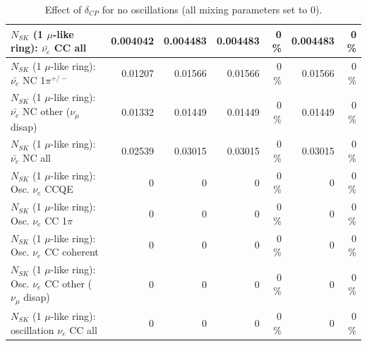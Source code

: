 \begin{table}
\begin{tabular}{| l | r | r | r  r | r  r |}
                            $N_{SK}$ (1 $\mu$-like ring): $\bar{\nu_{e}}$ CC all &        0.004042 &        0.004483 &        0.004483 &        0 \%  &        0.004483 &        0 \%  \\ 
\hline
                     $N_{SK}$ (1 $\mu$-like ring): $\bar{\nu_e}$ NC 1$\pi^{+/-}$ &         0.01207 &         0.01566 &         0.01566 &        0 \%  &         0.01566 &        0 \%  \\ 
          $N_{SK}$ (1 $\mu$-like ring): $\bar{\nu_e}$ NC other ($\nu_\mu$ disap) &         0.01332 &         0.01449 &         0.01449 &        0 \%  &         0.01449 &        0 \%  \\ 
                            $N_{SK}$ (1 $\mu$-like ring): $\bar{\nu_{e}}$ NC all &         0.02539 &         0.03015 &         0.03015 &        0 \%  &         0.03015 &        0 \%  \\ 
\hline
\hline
\hline
                                 $N_{SK}$ (1 $\mu$-like ring): Osc. $\nu_e$ CCQE &               0 &               0 &               0 &        0 \%  &               0 &        0 \%  \\ 
                            $N_{SK}$ (1 $\mu$-like ring): Osc. $\nu_e$ CC 1$\pi$ &               0 &               0 &               0 &        0 \%  &               0 &        0 \%  \\ 
                          $N_{SK}$ (1 $\mu$-like ring): Osc. $\nu_e$ CC coherent &               0 &               0 &               0 &        0 \%  &               0 &        0 \%  \\ 
           $N_{SK}$ (1 $\mu$-like ring): Osc. $\nu_e$ CC other ($\nu_\mu$ disap) &               0 &               0 &               0 &        0 \%  &               0 &        0 \%  \\ 
                        $N_{SK}$ (1 $\mu$-like ring): oscillation $\nu_e$ CC all &               0 &               0 &               0 &        0 \%  &               0 &        0 \%  \\ 
\hline
\hline
\end{tabular}
\caption{ Effect of $\delta_{CP}$ for no oscillations (all mixing parameters set to 0). }
\label{tab:num_deltacp_1RmuT_3f_osc_t13:0}
\end{table}
\clearpage
